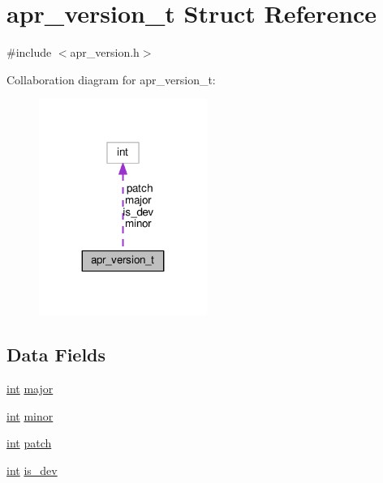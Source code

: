 \hypertarget{structapr__version__t}{}\section{apr\+\_\+version\+\_\+t Struct Reference}
\label{structapr__version__t}


{\ttfamily \#include $<$apr\+\_\+version.\+h$>$}



Collaboration diagram for apr\+\_\+version\+\_\+t\+:
\nopagebreak
\begin{figure}[H]
\begin{center}
\leavevmode
\includegraphics[width=155pt]{structapr__version__t__coll__graph}
\end{center}
\end{figure}
\subsection*{Data Fields}
\begin{DoxyCompactItemize}
\item 
\hyperlink{pcre_8txt_a42dfa4ff673c82d8efe7144098fbc198}{int} \hyperlink{structapr__version__t_a0ae64fee85387834ab76d9f9288373ab}{major}
\item 
\hyperlink{pcre_8txt_a42dfa4ff673c82d8efe7144098fbc198}{int} \hyperlink{structapr__version__t_aab0a1e8362517416389631bceeeedbad}{minor}
\item 
\hyperlink{pcre_8txt_a42dfa4ff673c82d8efe7144098fbc198}{int} \hyperlink{structapr__version__t_a98a629a88e776642d6e527d7535e0791}{patch}
\item 
\hyperlink{pcre_8txt_a42dfa4ff673c82d8efe7144098fbc198}{int} \hyperlink{structapr__version__t_aadc878af1010faa53e365e1142c81ced}{is\+\_\+dev}
\end{DoxyCompactItemize}


